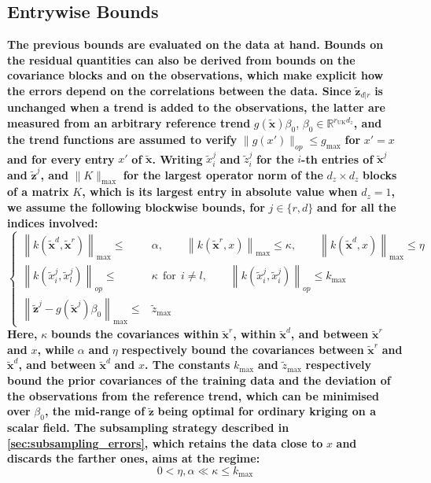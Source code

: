 \documentclass[preprint]{elsarticle}
\begin{document}
\subsection{Entrywise Bounds}\label{sec:entrywise_bounds}

\textbf{The previous bounds are evaluated on the data at hand. Bounds on the residual quantities can also be derived from bounds on the covariance blocks and on the observations, which make explicit how the errors depend on the correlations between the data. Since} $\tilde{\mathbf{z}}_{d|r}$ \textbf{is unchanged when a trend is added to the observations, the latter are measured from an arbitrary reference trend} $g(\tilde{\mathbf{x}})\beta_0$, $\beta_0\in\mathbb{R}^{r_{\mathrm{UK}}d_z}$\textbf{, and the trend functions are assumed to verify} $\|g(x')\|_{op}\leq g_{\max}$ \textbf{for} $x'=x$ \textbf{and for every entry} $x'$ \textbf{of} $\tilde{\mathbf{x}}$\textbf{. Writing} $\tilde{x}^j_i$ \textbf{and} $\tilde{z}^j_i$ \textbf{for the} $i$\textbf{-th entries of} $\tilde{\mathbf{x}}^j$ \textbf{and} $\tilde{\mathbf{z}}^j$\textbf{, and} $\|K\|_{\max}$ \textbf{for the largest operator norm of the} $d_z\times d_z$ \textbf{blocks of a matrix} $K$\textbf{, which is its largest entry in absolute value when} $d_z=1$\textbf{, we assume the following blockwise bounds, for} $j\in\{r,d\}$ \textbf{and for all the indices involved:}
\begin{equation}
    \left\{\begin{aligned}
    \left\|k(\tilde{\mathbf{x}}^d,\tilde{\mathbf{x}}^r)\right\|_{\max}\leq&\alpha,\qquad\left\|k(\tilde{\mathbf{x}}^r,x)\right\|_{\max}\leq\kappa,\qquad\left\|k(\tilde{\mathbf{x}}^d,x)\right\|_{\max}\leq\eta\\
    \left\|k(\tilde{x}^j_i,\tilde{x}^j_l)\right\|_{op}\leq&\kappa\:\:\text{for}\:\:i\neq l,\qquad\left\|k(\tilde{x}^j_i,\tilde{x}^j_i)\right\|_{op}\leq k_{\max}\\
    \left\|\tilde{\mathbf{z}}^j-g(\tilde{\mathbf{x}}^j)\beta_0\right\|_{\max}\leq&\tilde{z}_{\max}
    \end{aligned}\right.\label{eq:entrywise_assumptions}
\end{equation}
\textbf{Here,} $\kappa$ \textbf{bounds the covariances within} $\tilde{\mathbf{x}}^r$\textbf{, within} $\tilde{\mathbf{x}}^d$\textbf{, and between} $\tilde{\mathbf{x}}^r$ \textbf{and} $x$\textbf{, while} $\alpha$ \textbf{and} $\eta$ \textbf{respectively bound the covariances between} $\tilde{\mathbf{x}}^r$ \textbf{and} $\tilde{\mathbf{x}}^d$\textbf{, and between} $\tilde{\mathbf{x}}^d$ \textbf{and} $x$\textbf{. The constants} $k_{\max}$ \textbf{and} $\tilde{z}_{\max}$ \textbf{respectively bound the prior covariances of the training data and the deviation of the observations from the reference trend, which can be minimised over} $\beta_0$\textbf{, the mid-range of} $\tilde{\mathbf{z}}$ \textbf{being optimal for ordinary kriging on a scalar field. The subsampling strategy described in \cref{sec:subsampling_errors}, which retains the data close to} $x$ \textbf{and discards the farther ones, aims at the regime:}
\begin{equation}
    0<\eta,\alpha\ll\kappa\leq k_{\max}
\end{equation}
\end{document}
